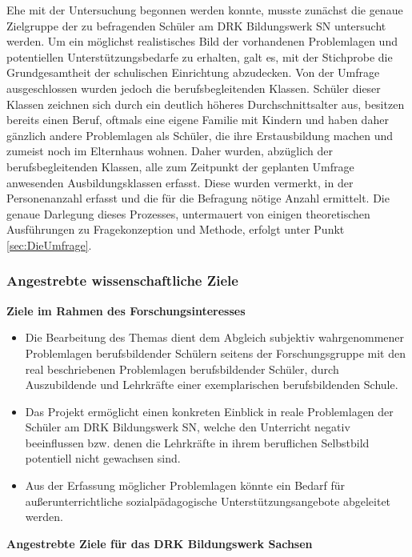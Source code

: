 Ehe mit der Untersuchung begonnen werden konnte, musste zunächst die genaue Zielgruppe der zu befragenden Schüler am DRK Bildungswerk SN untersucht werden. Um ein möglichst realistisches Bild der vorhandenen Problemlagen und potentiellen Unterstützungsbedarfe zu erhalten, galt es, mit der Stichprobe die Grundgesamtheit der schulischen Einrichtung abzudecken. Von der Umfrage ausgeschlossen wurden jedoch die berufsbegleitenden Klassen. Schüler dieser Klassen zeichnen sich durch ein deutlich höheres Durchschnittsalter aus, besitzen bereits einen Beruf, oftmals eine eigene Familie mit Kindern und haben daher gänzlich andere Problemlagen als Schüler, die ihre Erstausbildung machen und zumeist noch im Elternhaus wohnen. Daher wurden, abzüglich der berufsbegleitenden Klassen, alle zum Zeitpunkt der geplanten Umfrage anwesenden Ausbildungsklassen erfasst. Diese wurden vermerkt, in der Personenanzahl erfasst und die für die Befragung nötige Anzahl ermittelt. Die genaue Darlegung dieses Prozesses, untermauert von einigen theoretischen Ausführungen zu Fragekonzeption und Methode, erfolgt unter Punkt \ref{sec:DieUmfrage}. 

\subsubsection{Angestrebte wissenschaftliche Ziele}
\label{sec:AngestrebteWissenschaftlicheZiele}

\textbf{Ziele im Rahmen des Forschungsinteresses}

\begin{itemize}
	\item Die Bearbeitung des Themas dient dem Abgleich subjektiv wahrgenommener Problemlagen berufsbildender Schülern seitens der Forschungsgruppe mit den real beschriebenen Problemlagen berufsbildender Schüler, durch Auszubildende und Lehrkräfte einer exemplarischen berufsbildenden Schule.
	\item Das Projekt ermöglicht einen konkreten Einblick in reale Problemlagen der Schüler am DRK Bildungswerk SN, welche den Unterricht negativ beeinflussen bzw. denen die Lehrkräfte in ihrem beruflichen Selbstbild potentiell nicht gewachsen sind.
	\item Aus der Erfassung möglicher Problemlagen könnte ein Bedarf für außerunterrichtliche sozialpädagogische Unterstützungsangebote abgeleitet werden.
\end{itemize}

\noindent
\textbf{Angestrebte Ziele für das DRK Bildungswerk Sachsen}
 
